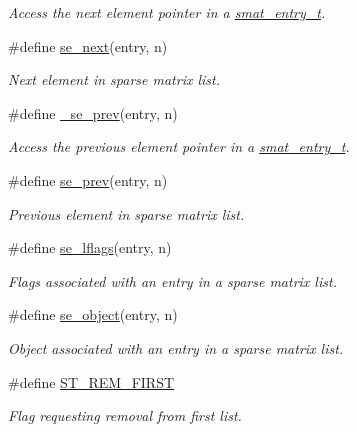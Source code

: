 \begin{CompactItemize}
\begin{CompactList}\small\item\em Access the next element pointer in a \hyperlink{group__dbprim__smat_ga2}{smat\_\-entry\_\-t}. \item\end{CompactList}\item 
\#define \hyperlink{group__dbprim__smat_ga61}{se\_\-next}(entry, n)
\begin{CompactList}\small\item\em Next element in sparse matrix list. \item\end{CompactList}\item 
\#define \hyperlink{group__dbprim__smat_ga62}{\_\-se\_\-prev}(entry, n)
\begin{CompactList}\small\item\em Access the previous element pointer in a \hyperlink{group__dbprim__smat_ga2}{smat\_\-entry\_\-t}. \item\end{CompactList}\item 
\#define \hyperlink{group__dbprim__smat_ga63}{se\_\-prev}(entry, n)
\begin{CompactList}\small\item\em Previous element in sparse matrix list. \item\end{CompactList}\item 
\#define \hyperlink{group__dbprim__smat_ga64}{se\_\-lflags}(entry, n)
\begin{CompactList}\small\item\em Flags associated with an entry in a sparse matrix list. \item\end{CompactList}\item 
\#define \hyperlink{group__dbprim__smat_ga65}{se\_\-object}(entry, n)
\begin{CompactList}\small\item\em Object associated with an entry in a sparse matrix list. \item\end{CompactList}\item 
\#define \hyperlink{group__dbprim__smat_ga66}{ST\_\-REM\_\-FIRST}
\begin{CompactList}\small\item\em Flag requesting removal from first list. \item\end{CompactList}\item 

\end{CompactItemize}
